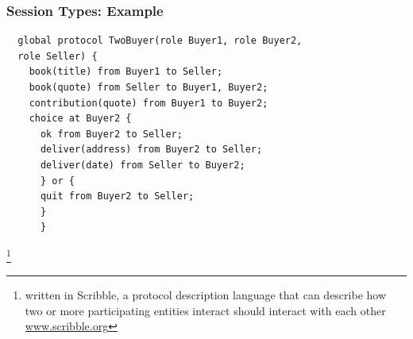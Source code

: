 \begin{frame}[fragile]\frametitle{Session Types: Example}
  \begin{lstlisting}
  global protocol TwoBuyer(role Buyer1, role Buyer2,
  role Seller) {
    book(title) from Buyer1 to Seller;
    book(quote) from Seller to Buyer1, Buyer2;
    contribution(quote) from Buyer1 to Buyer2;
    choice at Buyer2 {
      ok from Buyer2 to Seller;
      deliver(address) from Buyer2 to Seller;
      deliver(date) from Seller to Buyer2;
      } or {
      quit from Buyer2 to Seller;
      }
      }
  \end{lstlisting}\footnote{written in Scribble, a protocol description language that can describe how two or more participating entities interact should interact with each other \url{www.scribble.org}}
  ~\cite{honda2008multiparty}
\end{frame}
